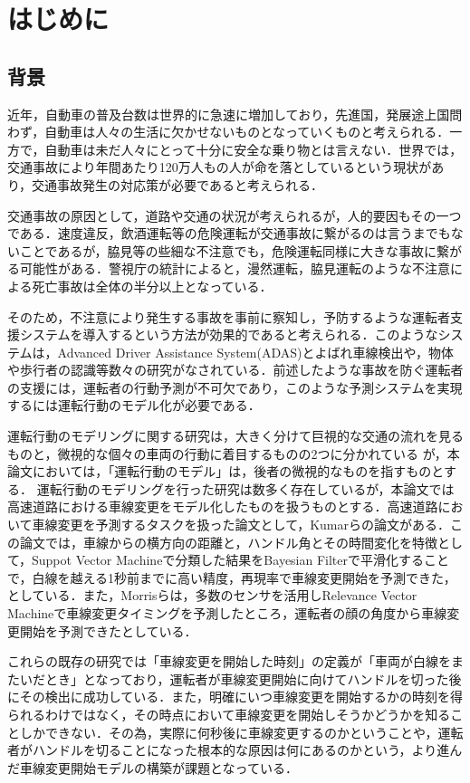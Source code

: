 \chapter{はじめに}
\section{背景}
近年，自動車の普及台数は世界的に急速に増加\cite{who}しており，先進国，発展途上国問わず，自動車は人々の生活に欠かせないものとなっていくものと考えられる．一方で，自動車は未だ人々にとって十分に安全な乗り物とは言えない．世界では，交通事故により年間あたり120万人もの人が命を落としているという現状があり\cite{who}，交通事故発生の対応策が必要であると考えられる．
\par
交通事故の原因として，道路や交通の状況が考えられるが，人的要因もその一つである．速度違反，飲酒運転等の危険運転が交通事故に繋がるのは言うまでもないことであるが，脇見等の些細な不注意でも，危険運転同様に大きな事故に繋がる可能性がある．警視庁の統計によると，漫然運転，脇見運転のような不注意による死亡事故は全体の半分以上となっている\cite{keishicho}．
\par
そのため，不注意により発生する事故を事前に察知し，予防するような運転者支援システムを導入するという方法が効果的であると考えられる．このようなシステムは，Advanced Driver Assistance System(ADAS)とよばれ車線検出\cite{yoo}や，物体や歩行者の認識\cite{Musleh}等数々の研究がなされている．前述したような事故を防ぐ運転者の支援には，運転者の行動予測が不可欠であり，このような予測システムを実現するには運転行動のモデル化が必要である．
\par
運転行動のモデリングに関する研究は，大きく分けて巨視的な交通の流れを見るものと，微視的な個々の車両の行動に着目するものの2つに分かれている
\cite{flow}
が，本論文においては，「運転行動のモデル」は，後者の微視的なものを指すものとする．
運転行動のモデリングを行った研究は数多く存在しているが，本論文では高速道路における車線変更をモデル化したものを扱うものとする．高速道路において車線変更を予測するタスクを扱った論文として，Kumar\cite{kumar}らの論文がある．この論文では，車線からの横方向の距離と，ハンドル角とその時間変化を特徴として，Suppot Vector Machineで分類した結果をBayesian Filterで平滑化することで，白線を越える1秒前までに高い精度，再現率で車線変更開始を予測できた，としている．また，Morris\cite{morris}らは，多数のセンサを活用しRelevance Vector Machineで車線変更タイミングを予測したところ，運転者の顔の角度から車線変更開始を予測できたとしている．
\par
これらの既存の研究では「車線変更を開始した時刻」の定義が「車両が白線をまたいだとき」となっており，運転者が車線変更開始に向けてハンドルを切った後にその検出に成功している．また，明確にいつ車線変更を開始するかの時刻を得られるわけではなく，その時点において車線変更を開始しそうかどうかを知ることしかできない．その為，実際に何秒後に車線変更するのかということや，運転者がハンドルを切ることになった根本的な原因は何にあるのかという，より進んだ車線変更開始モデルの構築が課題となっている．
